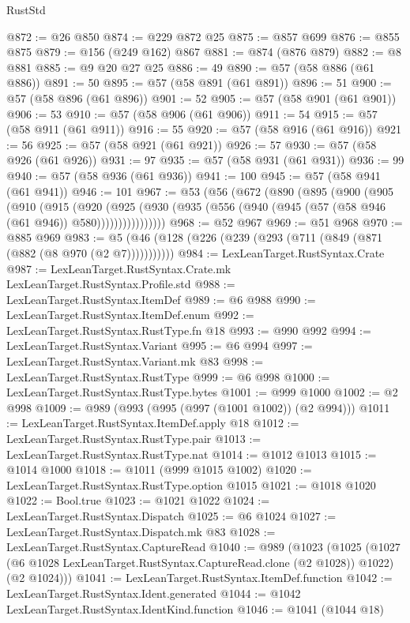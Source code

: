 \begin{lexlean}{RustStd}
\begin{coremodule}
@872 := @26 @850
@874 := @229 @872 @25
@875 := @857 @699
@876 := @855 @875
@879 := @156 (@249 @162) @867
@881 := @874 (@876 @879)
@882 := @8 @881
@885 := @9 @20 @27 @25
@886 := 49
@890 := @57 (@58 @886 (@61 @886))
@891 := 50
@895 := @57 (@58 @891 (@61 @891))
@896 := 51
@900 := @57 (@58 @896 (@61 @896))
@901 := 52
@905 := @57 (@58 @901 (@61 @901))
@906 := 53
@910 := @57 (@58 @906 (@61 @906))
@911 := 54
@915 := @57 (@58 @911 (@61 @911))
@916 := 55
@920 := @57 (@58 @916 (@61 @916))
@921 := 56
@925 := @57 (@58 @921 (@61 @921))
@926 := 57
@930 := @57 (@58 @926 (@61 @926))
@931 := 97
@935 := @57 (@58 @931 (@61 @931))
@936 := 99
@940 := @57 (@58 @936 (@61 @936))
@941 := 100
@945 := @57 (@58 @941 (@61 @941))
@946 := 101
@967 := @53
    (@56
      (@672
        (@890
          (@895
            (@900
              (@905
                (@910
                  (@915
                    (@920
                      (@925
                        (@930
                          (@935 (@556 (@940 (@945 (@57 (@58 @946 (@61 @946)) @580))))))))))))))))
@968 := @52 @967
@969 := @51 @968
@970 := @885 @969
@983 := @5 (@46 (@128 (@226 (@239 (@293 (@711 (@849 (@871 (@882 (@8 @970 (@2 @7)))))))))))
@984 := LexLeanTarget.RustSyntax.Crate
@987 := LexLeanTarget.RustSyntax.Crate.mk LexLeanTarget.RustSyntax.Profile.std
@988 := LexLeanTarget.RustSyntax.ItemDef
@989 := @6 @988
@990 := LexLeanTarget.RustSyntax.ItemDef.enum
@992 := LexLeanTarget.RustSyntax.RustType.fn @18
@993 := @990 @992
@994 := LexLeanTarget.RustSyntax.Variant
@995 := @6 @994
@997 := LexLeanTarget.RustSyntax.Variant.mk @83
@998 := LexLeanTarget.RustSyntax.RustType
@999 := @6 @998
@1000 := LexLeanTarget.RustSyntax.RustType.bytes
@1001 := @999 @1000
@1002 := @2 @998
@1009 := @989 (@993 (@995 (@997 (@1001 @1002)) (@2 @994)))
@1011 := LexLeanTarget.RustSyntax.ItemDef.apply @18
@1012 := LexLeanTarget.RustSyntax.RustType.pair
@1013 := LexLeanTarget.RustSyntax.RustType.nat
@1014 := @1012 @1013
@1015 := @1014 @1000
@1018 := @1011 (@999 @1015 @1002)
@1020 := LexLeanTarget.RustSyntax.RustType.option @1015
@1021 := @1018 @1020
@1022 := Bool.true
@1023 := @1021 @1022
@1024 := LexLeanTarget.RustSyntax.Dispatch
@1025 := @6 @1024
@1027 := LexLeanTarget.RustSyntax.Dispatch.mk @83
@1028 := LexLeanTarget.RustSyntax.CaptureRead
@1040 := @989
    (@1023
      (@1025
        (@1027 (@6 @1028 LexLeanTarget.RustSyntax.CaptureRead.clone (@2 @1028)) @1022)
        (@2 @1024)))
@1041 := LexLeanTarget.RustSyntax.ItemDef.function
@1042 := LexLeanTarget.RustSyntax.Ident.generated
@1044 := @1042 LexLeanTarget.RustSyntax.IdentKind.function
@1046 := @1041 (@1044 @18)

\end{coremodule}
\end{lexlean}
